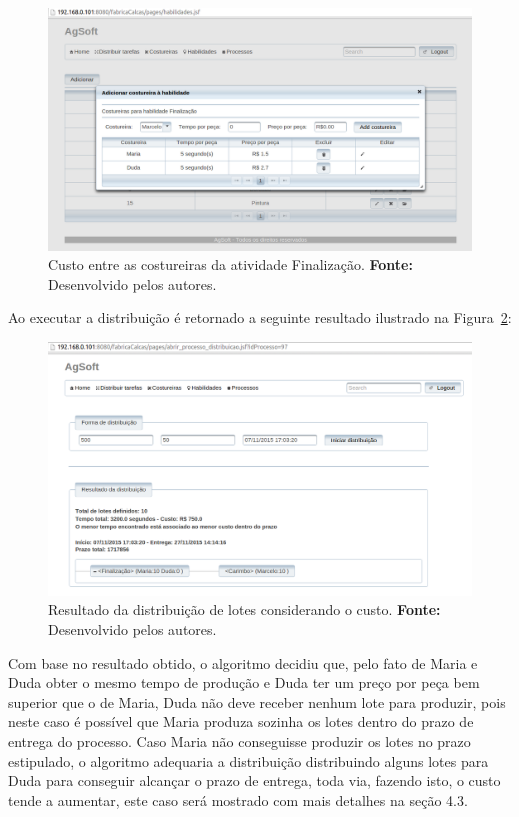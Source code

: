 \begin{figure}[h!]
	\centerline{\includegraphics[scale=0.3]{./imagens/custo_entre_costureiras_teste2.png}}
	\caption[Custo entre as costureiras da atividade Finalização.]
	{Custo entre as costureiras da atividade Finalização. \textbf{Fonte:}
	Desenvolvido pelos autores.}
	\label{fig:custo_entre_costureiras}
\end{figure}

\par Ao executar a distribuição é retornado a seguinte resultado ilustrado na Figura~\ref{fig:resultado_custo}:



\begin{figure}[h!]
	\centerline{\includegraphics[scale=0.3]{./imagens/resultado_teste2.png}}
	\caption[Resultado da distribuição de lotes considerando o custo.]
	{Resultado da distribuição de lotes considerando o custo. \textbf{Fonte:}
	Desenvolvido pelos autores.}
	\label{fig:resultado_custo}
\end{figure}

\par Com base no resultado obtido, o algoritmo decidiu que, pelo fato de
Maria e Duda obter o mesmo tempo de produção e Duda ter um preço por peça
bem superior que o de Maria, Duda não deve receber nenhum lote para produzir, pois neste
caso é possível que Maria produza sozinha os lotes dentro do prazo de entrega do
processo. Caso Maria não conseguisse produzir os lotes no prazo estipulado, o
algoritmo adequaria a distribuição distribuindo alguns lotes para Duda para
conseguir alcançar o prazo de entrega, toda via, fazendo isto, o custo tende a
aumentar, este caso será mostrado com mais detalhes na seção 4.3.

